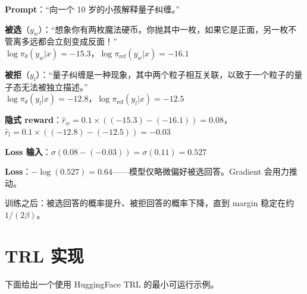 \begin{examplebox}[一个具体的 DPO 例子]
\textbf{Prompt}：“向一个 10 岁的小孩解释量子纠缠。”

\textbf{被选}（$y_w$）：“想象你有两枚魔法硬币。你抛其中一枚，如果它是正面，另一枚不管离多远都会立刻变成反面！”\\

$\log\pi_\theta(y_w|x) = -15.3$，$\log\pi_\text{ref}(y_w|x) = -16.1$

\textbf{被拒}（$y_l$）：“量子纠缠是一种现象，其中两个粒子相互关联，以致于一个粒子的量子态无法被独立描述。”\\

$\log\pi_\theta(y_l|x) = -12.8$，$\log\pi_\text{ref}(y_l|x) = -12.5$

\textbf{隐式 reward}：$\hat{r}_w = 0.1 \times ((-15.3) - (-16.1)) = 0.08$，$\hat{r}_l = 0.1 \times ((-12.8) - (-12.5)) = -0.03$

\textbf{Loss 输入}：$\sigma(0.08 - (-0.03)) = \sigma(0.11) = 0.527$

\textbf{Loss}：$-\log(0.527) = 0.64$——模型仅略微偏好被选回答。Gradient 会用力推动。

训练之后：被选回答的概率提升、被拒回答的概率下降，直到 margin 稳定在约 $1/(2\beta)$。
\end{examplebox}

\section{TRL 实现}
\label{trl-implementation-dup2}

下面给出一个使用 HuggingFace TRL 的最小可运行示例。

